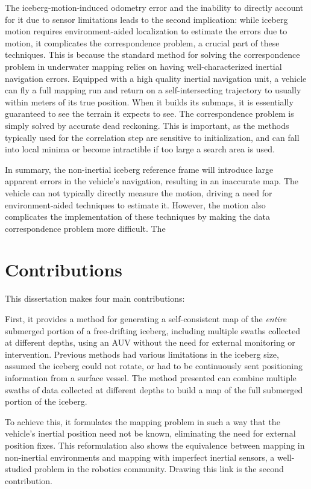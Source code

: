 The iceberg-motion-induced odometry error and the inability to directly account for it due to sensor limitations leads to the second implication: while iceberg motion requires environment-aided localization to estimate the errors due to motion, it complicates the correspondence problem, a crucial part of these techniques. This is because the standard method for solving the correspondence problem in underwater mapping relies on having well-characterized inertial navigation errors. Equipped with a high quality inertial navigation unit, a vehicle can fly a full mapping run and return on a self-intersecting trajectory to usually within meters of its true position. When it builds its submaps, it is essentially guaranteed to see the terrain it expects to see. The correspondence problem is simply solved by accurate dead reckoning. This is important, as the methods typically used for the correlation step are sensitive to initialization, and can fall into local minima or become intractible if too large a search area is used. 

In summary, the non-inertial iceberg reference frame will introduce large apparent errors in the vehicle's navigation, resulting in an inaccurate map. The vehicle can not typically directly measure the motion, driving a need for environment-aided techniques to estimate it. However, the motion also complicates the implementation of these techniques by making the data correspondence problem more difficult. The 

\section{Contributions}

This dissertation makes four main contributions:

First, it provides a method for generating a self-consistent map of the \emph{entire} submerged portion of a free-drifting iceberg, including multiple swaths collected at different depths, using an AUV without the need for external monitoring or intervention. Previous methods had various limitations in the iceberg size, assumed the iceberg could not rotate, or had to be continuously sent positioning information from a surface vessel. The method presented can combine multiple swaths of data collected at different depths to build a map of the full submerged portion of the iceberg. 

To achieve this, it formulates the mapping problem in such a way that the vehicle's inertial position need not be known, eliminating the need for external position fixes. This reformulation also shows the equivalence between mapping in non-inertial environments and mapping with imperfect inertial sensors, a well-studied problem in the robotics community. Drawing this link is the second contribution. 

